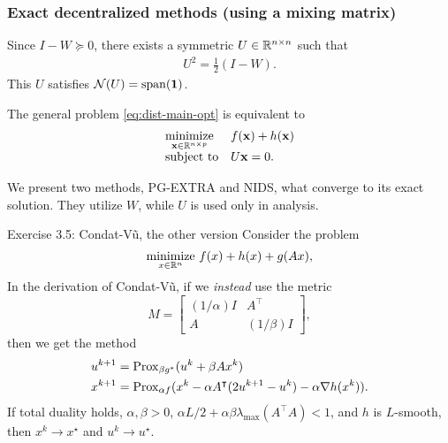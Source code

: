 \documentclass[10pt,mathserif]{beamer}
\begin{document}



\begin{frame}
\frametitle{Exact decentralized methods (using a mixing matrix)}
Since $I-W\succeq 0$, there exists a symmetric $U\in\mathbb{R}^{n\times n}$ such that
\begin{align*}
    U^2 = \frac{1}{2}(I-W).
\end{align*}
This $U$ satisfies $\mathcal{N}(U)=\mathrm{span}({\mathbf{1}})$.
\medskip

The general problem \eqref{eq:dist-main-opt} is equivalent to
\begin{equation}\label{eq:equiv-form-PGEXTRA-NIDS}
  \begin{array}{ll}
    \underset{{\mathbf{x}}\in\mathbb{R}^{n\times p}}{\mbox{minimize}} &f({\mathbf{x}})+h({\mathbf{x}})\\
    \mbox{subject to}&U{\mathbf{x}}=0.
  \end{array}
\end{equation}
\medskip

We present two methods, PG-EXTRA and NIDS, what converge to its exact solution. They utilize $W$, while $U$ is used only in analysis.
\end{frame}


\begin{frame}{Exercise 3.5: Condat-V\~u, the other version}
  Consider the problem
  \[
    \underset{x\in \mathbb{R}^n}{\mbox{minimize}}~f(x)+h(x)+g(Ax),
  \]
  In the derivation of Condat-V\~u, if we \emph{instead} use the metric
  \[
    M=
    \begin{bmatrix}
    (1/\alpha) I &A^\intercal\\
    A &(1/\beta) I
    \end{bmatrix},
  \]
  then we get the method
  \begin{align*}
     u ^{k+1}&=
    \mathrm{Prox}_{\beta g^*}( u ^k+\beta Ax^k)\\
    x^{k+1}&=
    \mathrm{Prox}_{\alpha f}(x^k-\alpha A^\intercal (2u ^{k+1}-u^k)-\alpha \nabla h(x^k)).
  \end{align*}
  If total duality holds,
  $\alpha,\beta>0$, $\alpha L/2+\alpha\beta\lambda_{\max}(A^\intercal A)<1$, and $h$ is $L$-smooth,
  then $x^k\rightarrow x^\star$ and $ u ^k\rightarrow  u ^\star$.
\end{frame}
\end{document}
